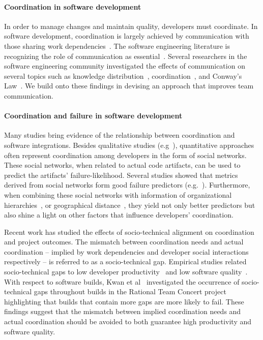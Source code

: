\documentclass[conference]{IEEEtran}
\begin{document}
\paragraph{Coordination in software development}
In order to manage changes and maintain quality, developers must coordinate. In
software development, coordination is largely achieved by communication with those sharing work dependencies~\cite{kraut1995:coordination}. 
The software engineering literature is recognizing the role of communication as essential~\cite{nakakoji2010:rdc}.
Several researchers in the software engineering community investigated the effects of communication on several topics such as knowledge distribution~\cite{ehrlich:icgse:2006}, coordination~\cite{hinds:cscw:2006}, and Conway's Law~\cite{cataldo:cscw:2006}.
We build onto these findings in devising an approach that improves team communication.


\paragraph{Coordination and failure in software development}
Many studies bring evidence of the relationship between coordination and software integrations. Besides qualitative studies (e.g~\cite{herbsleb:icse:1999}), quantitative approaches often represent coordination among developers in the form of social networks. These social networks, when related to actual code artifacts, can be used to predict the artifacts' failure-likelihood.
Several studies showed that metrics derived from social networks form good failure predictors (e.g.~\cite{meneely:fse:2008}).
Furthermore, when combining these social networks with information of organizational hierarchies~\cite{nagappan:icse:2008}, or geographical distance~\cite{bird:acm:2009}, they yield not only better predictors but also shine a light on other factors that influence developers' coordination.

Recent work has studied the effects of socio-technical alignment on coordination and project outcomes. The mismatch between coordination needs and actual coordination -- implied by work dependencies and developer social interactions respectively -- is referred to as a socio-technical gap. Empirical studies related socio-technical gaps to low developer productivity~\cite{valetto:msr:2007} and low software quality~\cite{kwan:tse:2011}.
With respect to software builds, Kwan et al~\cite{kwan:tse:2011} investigated the occurrence of socio-technical gaps throughout builds in the Rational Team Concert project highlighting that builds that contain more gaps are more likely to fail.
These findings suggest that the mismatch between implied coordination needs and actual coordination should be avoided to both guarantee high productivity and software quality.
  
\end{document}
